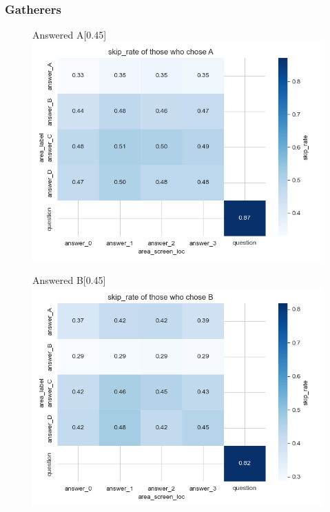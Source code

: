 \documentclass{article}
\begin{document}
\subsubsection{Gatherers}

\begin{figure}[H]
  \centering
  \begin{subcaptionbox}{Answered A\label{fig:A_sr_g}}[0.45\textwidth]
    {\centering\includegraphics[width=\linewidth]{plots/matrix_plots/matrix_skip_rate_A_gatherers.png}}
  \end{subcaptionbox}
  \hfill
  \begin{subcaptionbox}{Answered B\label{fig:B_sr_g}}[0.45\textwidth]
    {\centering\includegraphics[width=\linewidth]{plots/matrix_plots/matrix_skip_rate_B_gatherers.png}}
  \end{subcaptionbox}
  

\end{figure}
\end{document}
